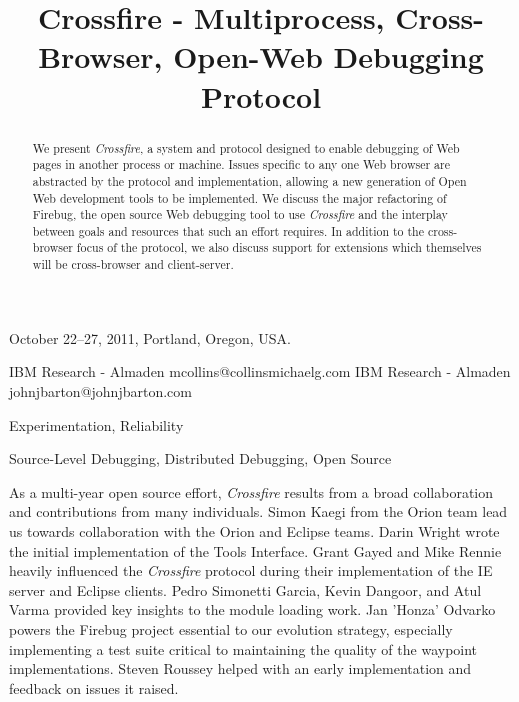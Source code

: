 \documentclass[10pt]{sigplanconf}
\begin{document}

 {October 22--27, 2011, Portland, Oregon,
USA.}


\title{Crossfire - Multiprocess, Cross-Browser, Open-Web Debugging Protocol}


           {IBM Research - Almaden}
           {mcollins@collinsmichaelg.com}
           {IBM Research - Almaden}
           {johnjbarton@johnjbarton.com}

\maketitle

%
\begin{abstract}
We present \textit{Crossfire}, a system and protocol designed to enable
debugging of Web pages in another process or machine. Issues specific to any one
Web browser are abstracted by the protocol and implementation,
allowing a new generation of Open Web development tools to be implemented. We discuss the major refactoring of Firebug, the open source Web debugging tool
to use \textit{Crossfire} and the interplay between goals and resources that such an effort requires.
In addition to the cross-browser focus of the protocol, we also discuss support for extensions which themselves will be
cross-browser and client-server.
\end{abstract}



\terms
Experimentation, Reliability

\keywords
Source-Level Debugging, Distributed Debugging, Open Source










\acks
As a multi-year open source effort, \textit{Crossfire} results from a broad collaboration and
contributions from many individuals. Simon Kaegi from the Orion team lead us towards collaboration with the Orion and Eclipse teams. Darin Wright wrote the initial implementation of the Tools Interface. Grant Gayed and Mike Rennie heavily influenced the \textit{Crossfire} protocol during their implementation of the IE server and Eclipse clients. Pedro Simonetti Garcia, Kevin Dangoor, and Atul Varma provided key insights to the module loading work. Jan 'Honza' Odvarko powers the Firebug project essential to our evolution strategy, especially implementing a test suite critical to maintaining the quality of the waypoint implementations. Steven Roussey helped with an early implementation and feedback on issues it raised.
\end{document}

